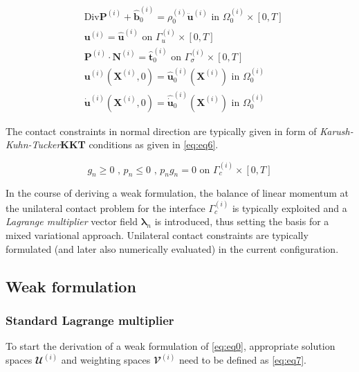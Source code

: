 \documentclass[a4paper,10pt]{article} %
\begin{document}
\begin{subequations}\label{eq:eq0}
\begin{align}
 & \text{Div} \mathbf{P}^{(i)}+\hat{\mathbf{b}}_0^{(i)}=\rho_0^{(i)}\ddot{\mathbf{u}}^{(i)} \text{ in } \Omega_0^{(i)} \times [0, T] \label{eq:subeq1}\\
 & \mathbf{u}^{(i)} = \hat{\mathbf{u}}^{(i)} \text{ on } \Gamma_u^{(i)} \times [0, T] \label{eq:subeq2}\\
 & \mathbf{P}^{(i)} \cdot \mathbf{N}^{(i)} = \hat{\mathbf{t}}_0^{(i)} \text{ on } \Gamma_\sigma^{(i)} \times [0, T] \label{eq:subeq3} \\
 & \mathbf{u}^{(i)}\left( \mathbf{X}^{(i)}, 0\right) = \hat{\mathbf{u}}_0^{(i)}\left( \mathbf{X}^{(i)}\right) \text{ in } \Omega_0^{(i)} \label{eq:subeq4} \\
 & \dot{\mathbf{u}}^{(i)}\left( \mathbf{X}^{(i)}, 0\right) = \hat{\dot{\mathbf{u}}}_0^{(i)}\left( \mathbf{X}^{(i)}\right) \text{ in } \Omega_0^{(i)} \label{eq:subeq5}
 \end{align}
\end{subequations}

The contact constraints in normal direction are typically given in form of \textit{Karush-Kuhn-Tucker}\textbf{KKT} conditions as given in \eqref{eq:eq6}.
 
 \begin{equation}\label{eq:eq6}
g_n \geq 0 \text{ , } p_n \leq 0 \text{ , } p_n g_n = 0 \text{ on } \Gamma_c^{(i)} \times [0, T]
 \end{equation}

In the course of deriving a weak formulation, the balance of linear momentum at the unilateral contact problem  for the interface $\Gamma_c^{(i)}$ is typically exploited and a \textit{Lagrange multiplier} vector field $\boldsymbol{\lambda}_n$ is introduced, thus setting the basis for a mixed variational approach. Unilateral contact constraints are typically
formulated (and later also numerically evaluated) in the current configuration.

\subsection{Weak formulation}

\subsubsection{Standard Lagrange multiplier}

To start the derivation of a weak formulation of \eqref{eq:eq0}, appropriate solution spaces $\mathbfcal{U}^{(i)}$ and
weighting spaces $\mathbfcal{V}^{(i)}$ need to be defined as \eqref{eq:eq7}.
\end{document}
